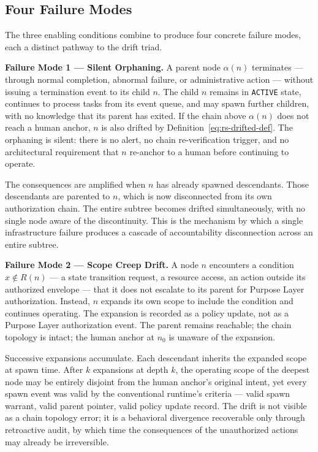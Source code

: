 \subsection{Four Failure Modes}
\label{sec:rs-drift-failure-modes}

The three enabling conditions combine to produce four concrete failure modes, each a distinct pathway to the drift triad.

\medskip
\noindent\textbf{Failure Mode 1 — Silent Orphaning.}
A parent node $\alpha(n)$ terminates — through normal completion, abnormal failure, or administrative action — without issuing a termination event to its child $n$. The child $n$ remains in \texttt{ACTIVE} state, continues to process tasks from its event queue, and may spawn further children, with no knowledge that its parent has exited. If the chain above $\alpha(n)$ does not reach a human anchor, $n$ is also drifted by Definition~\ref{eq:rs-drifted-def}. The orphaning is silent: there is no alert, no chain re-verification trigger, and no architectural requirement that $n$ re-anchor to a human before continuing to operate.

The consequences are amplified when $n$ has already spawned descendants. Those descendants are parented to $n$, which is now disconnected from its own authorization chain. The entire subtree becomes drifted simultaneously, with no single node aware of the discontinuity. This is the mechanism by which a single infrastructure failure produces a cascade of accountability disconnection across an entire subtree.

\medskip
\noindent\textbf{Failure Mode 2 — Scope Creep Drift.}
A node $n$ encounters a condition $x \notin R(n)$ — a state transition request, a resource access, an action outside its authorized envelope — that it does not escalate to its parent for Purpose Layer authorization. Instead, $n$ expands its own scope to include the condition and continues operating. The expansion is recorded as a policy update, not as a Purpose Layer authorization event. The parent remains reachable; the chain topology is intact; the human anchor at $n_0$ is unaware of the expansion.

Successive expansions accumulate. Each descendant inherits the expanded scope at spawn time. After $k$ expansions at depth $k$, the operating scope of the deepest node may be entirely disjoint from the human anchor's original intent, yet every spawn event was valid by the conventional runtime's criteria — valid spawn warrant, valid parent pointer, valid policy update record. The drift is not visible as a chain topology error; it is a behavioral divergence recoverable only through retroactive audit, by which time the consequences of the unauthorized actions may already be irreversible.

